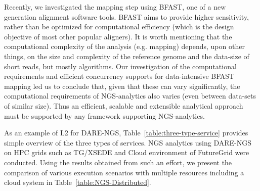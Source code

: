 \documentclass[]{svjour3}
\begin{document}
Recently, we investigated the mapping step using BFAST, one of a new
generation alignment software tools. BFAST aims to provide higher
sensitivity, rather than be optimized for computational efficiency
(which is the design objective of most other popular aligners).
It is worth mentioning that the computational complexity of the
analysis (e.g. mapping) depends, upon other things, on the size and
complexity of the reference genome and the data-size of short reads,
but mostly algorithms\cite{dare-ecmls11}. Our investigation of the
computational requirements and efficient concurrency supports for
data-intensive BFAST mapping led us to conclude that, given that these
can vary significantly, the computational requirements of
NGS-analytics also varies (even between data-sets of similar
size). Thus an efficient, scalable and extensible analytical approach
must be supported by any framework supporting NGS-analytics.


As an example of L2 for DARE-NGS, Table~\ref{table:three-type-service}
provides simple overview of the three types of services.
NGS analytics using DARE-NGS on HPC grids such as TG/XSEDE and Cloud
environment of FutureGrid were conducted\cite{dare-ecmls11}. Using the
results obtained from such an effort, we present the comparison of
various execution scenarios with multiple resources including a cloud
system in Table~\ref{table:NGS-Distributed}. 
\end{document}
